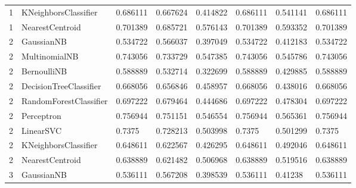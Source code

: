 \documentclass{article}
\begin{document}
\begin{table}[h]
\begin{tabular}{llllllll}
1             & KNeighborsClassifier   & 0.686111          & 0.667624          & 0.414822              & 0.686111              & 0.541141                 & 0.686111                 \\
1             & NearestCentroid        & 0.701389          & 0.685721          & 0.576143              & 0.701389              & 0.593352                 & 0.701389                 \\
2             & GaussianNB             & 0.534722          & 0.566037          & 0.397049              & 0.534722              & 0.412183                 & 0.534722                 \\
2             & MultinomialNB          & 0.743056          & 0.733729          & 0.547385              & 0.743056              & 0.545786                 & 0.743056                 \\
2             & BernoulliNB            & 0.588889          & 0.532714          & 0.322699              & 0.588889              & 0.429885                 & 0.588889                 \\
2             & DecisionTreeClassifier & 0.668056          & 0.656846          & 0.458957              & 0.668056              & 0.438016                 & 0.668056                 \\
2             & RandomForestClassifier & 0.697222          & 0.679464          & 0.444686              & 0.697222              & 0.478304                 & 0.697222                 \\
2             & Perceptron             & 0.756944          & 0.751151          & 0.546554              & 0.756944              & 0.565361                 & 0.756944                 \\
2             & LinearSVC              & 0.7375            & 0.728213          & 0.503998              & 0.7375                & 0.501299                 & 0.7375                   \\
2             & KNeighborsClassifier   & 0.648611          & 0.622567          & 0.426295              & 0.648611              & 0.492046                 & 0.648611                 \\
2             & NearestCentroid        & 0.638889          & 0.621482          & 0.506968              & 0.638889              & 0.519516                 & 0.638889                 \\
3             & GaussianNB             & 0.536111          & 0.567208          & 0.398539              & 0.536111              & 0.41238                  & 0.536111                 \\

\end{tabular}
\end{table}
\end{document}
